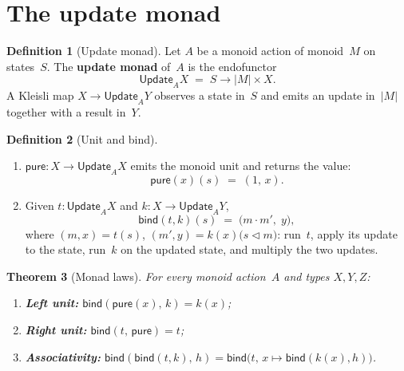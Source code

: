 \documentclass[11pt,a4paper]{article}
\theoremstyle{plain}
\newtheorem{theorem}{Theorem}[section]
\theoremstyle{definition}
\newtheorem{definition}[theorem]{Definition}
\newcommand{\Update}{\mathsf{Update}}
\begin{document}
\section{The update monad}

\begin{definition}[Update monad]\label{def:update}
Let $A$ be a monoid action of monoid~$M$ on states~$S$. The
\textbf{update monad} of~$A$ is the endofunctor
\begin{equation}
  \Update_A X \;=\; S \longrightarrow |M| \times X.
\end{equation}
A Kleisli map $X \to \Update_A Y$ observes a state in~$S$ and emits an
update in~$|M|$ together with a result in~$Y$.
\end{definition}

\begin{definition}[Unit and bind]\label{def:pure-bind}
\begin{enumerate}
  \item $\mathsf{pure} : X \to \Update_A X$ emits the monoid unit and
        returns the value:
        \[
          \mathsf{pure}(x)(s) \;=\; (1,\, x).
        \]
  \item Given $t : \Update_A X$ and $k : X \to \Update_A Y$,
        \[
          \mathsf{bind}(t,k)(s)
          \;=\;
          \bigl(
            m \cdot m',\;
            y
          \bigr),
        \]
        where $(m,x) = t(s)$, $(m',y) = k(x)\bigl(s \mathbin{\triangleleft} m\bigr)$:
        run~$t$, apply its update to the state, run~$k$ on the updated
        state, and multiply the two updates.
\end{enumerate}
\end{definition}

\begin{theorem}[Monad laws]\label{thm:monad}
For every monoid action~$A$ and types $X,Y,Z$:
\begin{enumerate}
  \item \textbf{Left unit:}
        $\mathsf{bind}(\mathsf{pure}(x),\, k) = k(x)$;
  \item \textbf{Right unit:}
        $\mathsf{bind}(t,\, \mathsf{pure}) = t$;
  \item \textbf{Associativity:}
        $\mathsf{bind}(\mathsf{bind}(t,k),\, h)
         = \mathsf{bind}\bigl(t,\, x \mapsto \mathsf{bind}(k(x),h)\bigr)$.
\end{enumerate}
\end{theorem}
\end{document}
